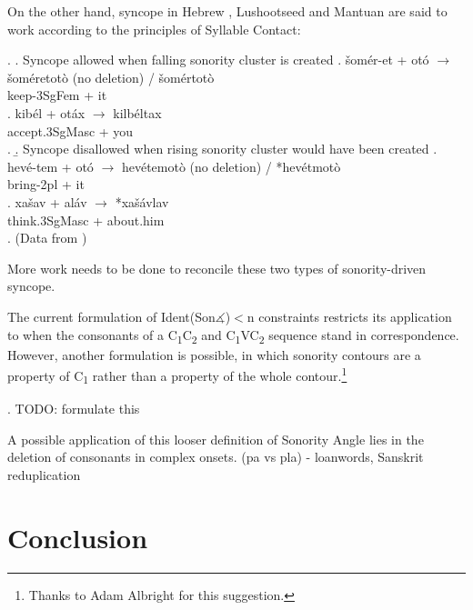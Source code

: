\documentclass[12pt]{article}
\begin{document}
On the other hand, syncope in Hebrew \citep{landau.1997}, Lushootseed \citep{urbanczyk.1996} and Mantuan \citep{miglio.1998} are said to work according to the principles of Syllable Contact:

\ex. \a. Syncope allowed when falling sonority cluster is created
     \ag. \v{s}om\'er-et + ot\'o $\rightarrow$ \v{s}om\'eretot\`o (no deletion) / \v{s}om\'ertot\`o \\
          keep-3SgFem + it \\
     \bg. kib\'el + ot\'ax $\rightarrow$ kilb\'eltax \\
          accept.3SgMasc + you \\
     \z.
     \b. Syncope disallowed when rising sonority cluster would have been created
     \ag. hev\'e-tem + ot\'o $\rightarrow$ hev\'etemot\`o (no deletion) / *hev\'etmot\`o \\
          bring-2pl + it \\
     \bg. xa\v{s}av + al\'av $\rightarrow$ *xa\v{s}\'avlav \\
          think.3SgMasc + about.him \\
     \z.
     (Data from \citep{landau.1997})

More work needs to be done to reconcile these two types of sonority-driven syncope.

\bigskip

 The current formulation of {\sc Ident(Son$\measuredangle$)}$<$n constraints restricts its application to when the consonants of a C\textsubscript{1}C\textsubscript{2} and C\textsubscript{1}VC\textsubscript{2} sequence stand in correspondence. However, another formulation is possible, in which sonority contours are a property of C\textsubscript{1} rather than a property of the whole contour.\footnote{Thanks to Adam Albright for this suggestion.}

\bigskip


\ex. TODO: formulate this

A possible application of this looser definition of {\sc Sonority Angle} lies in the deletion of consonants in complex onsets. (pa vs pla) - loanwords, Sanskrit reduplication



\section{Conclusion} \label{conclusion}
\end{document}
